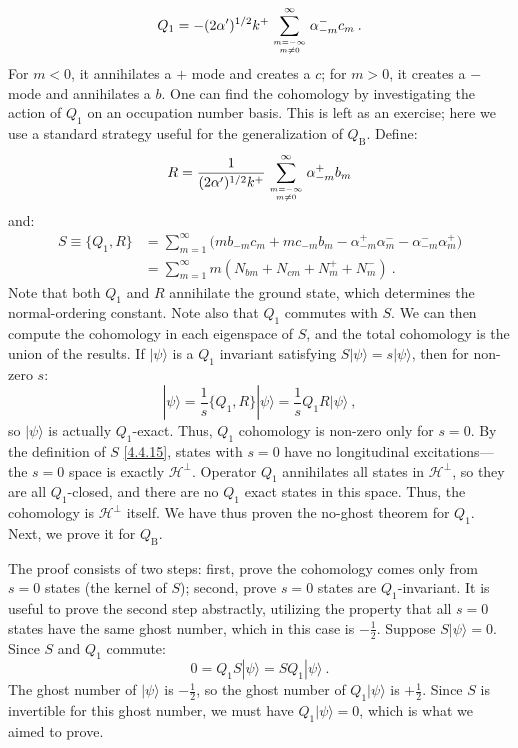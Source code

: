 \begin{equation}
Q_{1}=-(2 \alpha^{\prime})^{1 / 2} k^{+} \sum_{m=-\infty \atop m \neq 0}^{\infty} \alpha_{-m}^{-} c_{m} \:. \label{4.4.13}
\end{equation}
For $m<0$, it annihilates a $+$ mode and creates a $c$; for $m>0$, it creates a $-$ mode and annihilates a $b$. One can find the cohomology by investigating the action of $Q_{1}$ on an occupation number basis. This is left as an exercise; here we use a standard strategy useful for the generalization of $Q_{\mathrm{B}}$. Define:
\begin{equation}
R=\frac{1}{(2 \alpha^{\prime})^{1 / 2} k^{+}} \sum_{m=-\infty \atop m \neq 0}^{\infty} \alpha_{-m}^{+} b_{m} \label{4.4.14}
\end{equation}
and:
\begin{align}
S \equiv \{Q_{1}, R \} &=\sum_{m=1}^{\infty}\bigl(m b_{-m} c_{m}+m c_{-m} b_{m}-\alpha_{-m}^{+} \alpha_{m}^{-}-\alpha_{-m}^{-} \alpha_{m}^{+}\bigr)  \nonumber \\
&=\sum_{m=1}^{\infty} m(N_{b m}+N_{c m}+N_{m}^{+}+N_{m}^{-}) \:. \label{4.4.15}
\end{align}
Note that both $Q_{1}$ and $R$ annihilate the ground state, which determines the normal-ordering constant. Note also that $Q_{1}$ commutes with $S$. We can then compute the cohomology in each eigenspace of $S$, and the total cohomology is the union of the results. If $|\psi\rangle$ is a $Q_{1}$ invariant satisfying $S|\psi\rangle=s|\psi\rangle$, then for non-zero $s$:
\begin{equation}
|\psi\rangle=\frac{1}{s}\{Q_{1}, R\}|\psi\rangle=\frac{1}{s} Q_{1} R|\psi\rangle \:, \label{4.4.16}
\end{equation}
so $|\psi\rangle$ is actually $Q_{1}$-exact. Thus, $Q_{1}$ cohomology is non-zero only for $s=0$. By the definition of $S$ \eqref{4.4.15}, states with $s=0$ have no longitudinal excitations—the $s=0$ space is exactly $\mathscr{H}^{\perp}$. Operator $Q_{1}$ annihilates all states in $\mathscr{H}^{\perp}$, so they are all $Q_{1}$-closed, and there are no $Q_{1}$ exact states in this space. Thus, the cohomology is $\mathscr{H}^{\perp}$ itself. We have thus proven the no-ghost theorem for $Q_{1}$. Next, we prove it for $Q_{\mathrm{B}}$.

The proof consists of two steps: first, prove the cohomology comes only from $s=0$ states (the kernel of $S$); second, prove $s=0$ states are $Q_{1}$-invariant. It is useful to prove the second step abstractly, utilizing the property that all $s=0$ states have the same ghost number, which in this case is $-\frac{1}{2}$. Suppose $S|\psi\rangle=0$. Since $S$ and $Q_{1}$ commute:
\begin{equation}
0=Q_{1} S|\psi\rangle=S Q_{1}|\psi\rangle \:. \label{4.4.17}
\end{equation}
The ghost number of $|\psi\rangle$ is $-\frac{1}{2}$, so the ghost number of $Q_{1}|\psi\rangle$ is $+\frac{1}{2}$. Since $S$ is invertible for this ghost number, we must have $Q_{1}|\psi\rangle=0$, which is what we aimed to prove.

